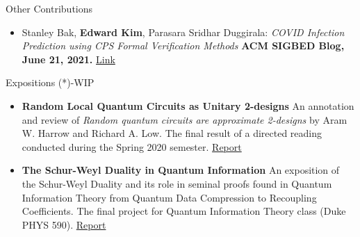 \documentclass{resume} %
\begin{document}
\begin{rSection}{Other Contributions}
  \begin{itemize}[leftmargin=*]

    \item Stanley Bak, {\bf Edward Kim}, Parasara Sridhar Duggirala: \newline
    \textit{COVID Infection Prediction using CPS Formal Verification Methods} \newline
    {\bf ACM SIGBED Blog, June 21, 2021.} \href{https://sigbed.org/2021/06/21/sidbed-blog-covid-formal-verification/}{Link}
  \end{itemize}
\end{rSection}
\newpage
\begin{rSection}{Expositions} (*)-WIP
  \begin{itemize}[leftmargin=*]

    \item {\bf Random Local Quantum Circuits as Unitary 2-designs} \hfill \newline
     An annotation and review of \textit{Random quantum circuits are approximate 2-designs} by Aram W. Harrow and Richard A. Low. The final result of a directed reading conducted during the Spring 2020 semester.
    \href{https://github.com/ekim1919/Research/blob/master/PHYS790/final.pdf}{Report}

    \item {\bf The Schur-Weyl Duality in Quantum Information} \hfill \hfill \newline
    An exposition of the Schur-Weyl Duality and its role in seminal proofs found in Quantum Information Theory from Quantum Data Compression to Recoupling Coefficients. The final project for Quantum Information Theory class (Duke PHYS 590).
    \href{https://github.com/ekim1919/Research/blob/master/P590/final.pdf}{Report}


\end{itemize}
\end{rSection}
\end{document}

